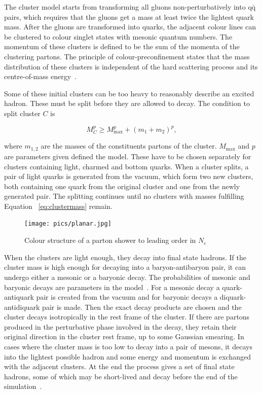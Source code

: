 The cluster model starts from transforming all gluons non-perturbatively into $\mathrm{q \bar q}$ pairs, which requires that the gluons get a mass at least twice the lightest quark mass. After the gluons are transformed into quarks, the adjacent colour lines can be clustered to colour singlet states with mesonic quantum numbers. The momentum of these clusters is defined to be the sum of the momenta of the clustering partons. The principle of colour-preconfinement states that the mass distribution of these clusters is independent of the hard scattering process and its centre-of-mass energy~\cite{herwigManual}. %

Some of these initial clusters can be too heavy to reasonably describe an excited hadron. These must be
split before they are allowed to decay. The condition to split cluster $C$ is~\cite{herwigManual}

\begin{equation}
M_C^p \geq M_\mathrm{max}^p  + \left( m_1 + m_2\right)^p,
\label{eq:clustermass}
\end{equation}

\noindent where $m_{1,2}$ are the masses of the constituents partons of the cluster. $M_\mathrm{max}$ and $p$ are parameters given defined the model. These have to be chosen separately for clusters containing light, charmed and bottom quarks. When a cluster splits, a pair of light quarks is generated from the vacuum, which form two new clusters, both containing one quark from the original cluster and one from the newly generated pair. The splitting continues until no clusters with masses fulfilling Equation ~\ref{eq:clustermass} remain.

\begin{figure}
\centering
\texttt{[image: pics/planar.jpg]}
\caption[]{ Colour structure of a parton shower to leading order in $N_c$
\cite{eventGenerators} }
\label{fig:colourstructure}
\end{figure}

When the clusters are light enough, they decay into final state hadrons. If the cluster mass is high enough for decaying into a baryon-antibaryon pair, it can undergo either a mesonic or a baryonic decay. The probabilities of mesonic and baryonic decays are parameters in the model~\cite{herwigManual}.
For a mesonic decay a quark-antiquark pair is created from the vacuum and for baryonic decays a diquark-antidiquark pair is made. Then the exact decay products are chosen and the cluster decays isotropically in the rest frame of the cluster. If there are partons produced in the perturbative phase involved in the decay, they retain their original direction in the cluster rest frame, up to some Gaussian smearing. In cases where the cluster mass is too low to decay into a pair of mesons, it decays into the lightest possible hadron and some energy and momentum is exchanged with the adjacent clusters. At the end the process gives a set of final state hadrons, some of which may be short-lived and decay before the end of the simulation~\cite{herwigManual}.

